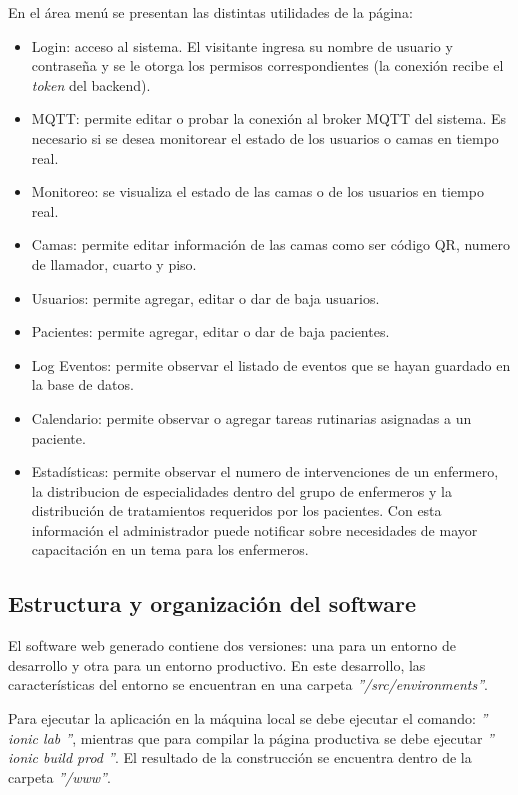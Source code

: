 En el área menú se presentan las distintas utilidades de la página:
\begin{itemize}
\item Login: acceso al sistema. El visitante ingresa su nombre de usuario y contraseña y se le otorga los permisos correspondientes (la conexión recibe el \textit{token} del backend).
\item MQTT: permite editar o probar la conexión al broker MQTT del sistema. Es necesario si se desea monitorear el estado de los usuarios o camas en tiempo real.
\item Monitoreo: se visualiza el estado de las camas o de los usuarios en tiempo real.
\item Camas: permite editar información de las camas como ser código QR, numero de llamador, cuarto y piso.
\item Usuarios: permite agregar, editar o dar de baja usuarios.
\item Pacientes: permite agregar, editar o dar de baja pacientes.
\item Log Eventos: permite observar el listado de eventos que se hayan guardado en la base de datos.
\item Calendario: permite observar o agregar tareas rutinarias asignadas a un paciente.
\item Estadísticas: permite observar el numero de intervenciones de un enfermero, la distribucion de especialidades dentro del grupo de enfermeros y la distribución de tratamientos requeridos por los pacientes. Con esta información el administrador puede notificar sobre necesidades de mayor capacitación en un tema para los enfermeros.
\end{itemize}


\subsection{Estructura y organización del software}

El software web generado contiene dos versiones: una para un entorno de desarrollo y otra para un entorno productivo. En este desarrollo, las características del entorno se encuentran en una carpeta \textit{''/src/environments''}. 

Para ejecutar la aplicación en la máquina local se debe ejecutar el comando:  \textit{'' ionic lab ''}, mientras que para compilar la página productiva se debe ejecutar \textit{'' ionic build prod ''}. El resultado de la construcción se encuentra dentro de la carpeta \textit{''/www''}.

